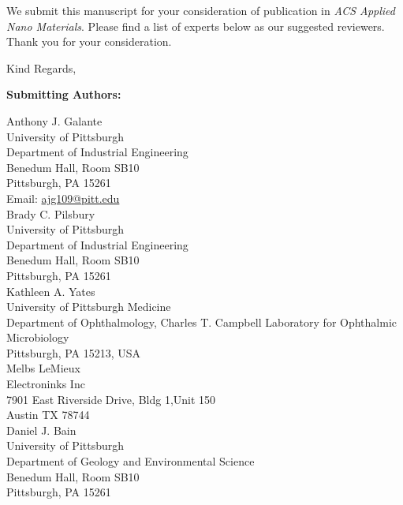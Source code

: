 \documentclass[11pt]{letter}
\begin{document}
\begin{letter}{}
We submit this manuscript for your consideration of publication in %
\textit{ACS Applied Nano Materials}.
Please find a list of experts below as our suggested reviewers.
Thank you for your consideration.

\closing{Kind Regards,}


\end{letter}

\newpage

\textbf{Submitting Authors:}

Anthony J. Galante\\
University of Pittsburgh \\
Department of Industrial Engineering \\
Benedum Hall, Room SB10 \\
Pittsburgh, PA 15261\\
Email:  \href{mailto:ajg109@pitt.edu}{ajg109@pitt.edu}\\

Brady C. Pilsbury \\
University of Pittsburgh \\
Department of Industrial Engineering \\
Benedum Hall, Room SB10 \\
Pittsburgh, PA 15261\\

Kathleen A. Yates\\
University of Pittsburgh Medicine\\
Department of Ophthalmology, Charles T. Campbell Laboratory for Ophthalmic Microbiology\\
Pittsburgh, PA 15213, USA\\

Melbs LeMieux \\
Electroninks Inc \\ 
7901 East Riverside Drive, Bldg 1,Unit 150\\
Austin TX  78744 \\

Daniel J. Bain \\
University of Pittsburgh \\
Department of Geology and Environmental Science\\
Benedum Hall, Room SB10 \\
Pittsburgh, PA 15261\\
\end{document}
